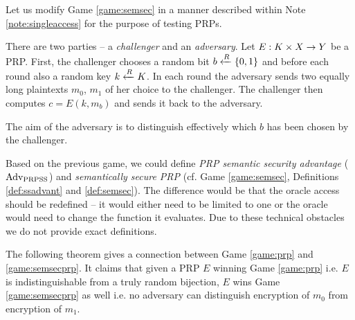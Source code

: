 Let us modify Game \ref{game:semsec} in a manner described within Note \ref{note:singleaccess} for the purpose of testing PRPs.

\begin{game}
\label{game:semsecprp}
	There are two parties -- a {\em challenger} and an {\em adversary}. Let $E:K\times X\rightarrow Y$ be a PRP. First, the challenger chooses a random bit $b\xleftarrow{R}\{0,1\}$ and before each round also a random key $k\xleftarrow{R} K$. In each round the adversary sends two equally long plaintexts $m_0$, $m_1$ of her choice to the challenger. The challenger then computes $c = E(k,m_b)$ and sends it back to the adversary.
	
	The aim of the adversary is to distinguish effectively which $b$ has been chosen by the challenger.
\end{game}

\begin{note}
\label{note:semsecprp}
	Based on the previous game, we could define {\em PRP semantic security advantage} ($\operatorname*{Adv_{PRPSS}}$) and {\em semantically secure PRP} (cf. Game \ref{game:semsec}, Definitions \ref{def:ssadvant} and \ref{def:semsec}). The difference would be that the oracle access should be redefined -- it would either need to be limited to one or the oracle would need to change the function it evaluates. Due to these technical obstacles we do not provide exact definitions.
\end{note}

The following theorem gives a connection between Game \ref{game:prp} and \ref{game:semsecprp}. It claims that given a PRP $E$ winning Game \ref{game:prp} i.e. $E$ is indistinguishable from a truly random bijection, $E$ wins Game \ref{game:semsecprp} as well i.e. no adversary can distinguish encryption of $m_0$ from encryption of $m_1$.

